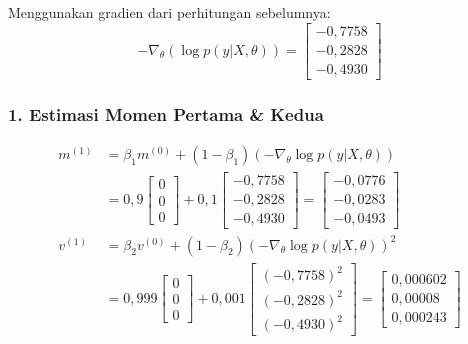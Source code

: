 \documentclass[11pt,a4paper]{article}
\def\boldsymbol#1{#1}%
\def\mathbf#1{#1}%
\begin{document}
\noindent Menggunakan gradien dari perhitungan sebelumnya:
$$-\nabla_{\boldsymbol{\theta}} \left( \log p(\mathbf{y}|X, \boldsymbol{\theta}) \right) = \begin{bmatrix} -0{,}7758 \\ -0{,}2828 \\ -0{,}4930 \end{bmatrix}$$

\subsubsection*{1. Estimasi Momen Pertama \& Kedua}
\begin{align}
\mathbf{m}^{(1)} &= \beta_1 \mathbf{m}^{(0)} + (1 - \beta_1)\left( -\nabla_{\boldsymbol{\theta}} \log p(\mathbf{y}|X, \boldsymbol{\theta}) \right) \nonumber \\
&= 0{,}9 \begin{bmatrix} 0 \\ 0 \\ 0 \end{bmatrix} + 0{,}1 \begin{bmatrix} -0{,}7758 \\ -0{,}2828 \\ -0{,}4930 \end{bmatrix} = \begin{bmatrix} -0{,}0776 \\ -0{,}0283 \\ -0{,}0493 \end{bmatrix} \\
\mathbf{v}^{(1)} &= \beta_2 \mathbf{v}^{(0)} + (1 - \beta_2)\left( -\nabla_{\boldsymbol{\theta}} \log p(\mathbf{y}|X, \boldsymbol{\theta}) \right)^2 \nonumber \\
&= 0{,}999 \begin{bmatrix} 0 \\ 0 \\ 0 \end{bmatrix} + 0{,}001 \begin{bmatrix} (-0{,}7758)^2 \\ (-0{,}2828)^2 \\ (-0{,}4930)^2 \end{bmatrix} = \begin{bmatrix} 0{,}000602 \\ 0{,}00008 \\ 0{,}000243 \end{bmatrix}
\end{align}
\end{document}
